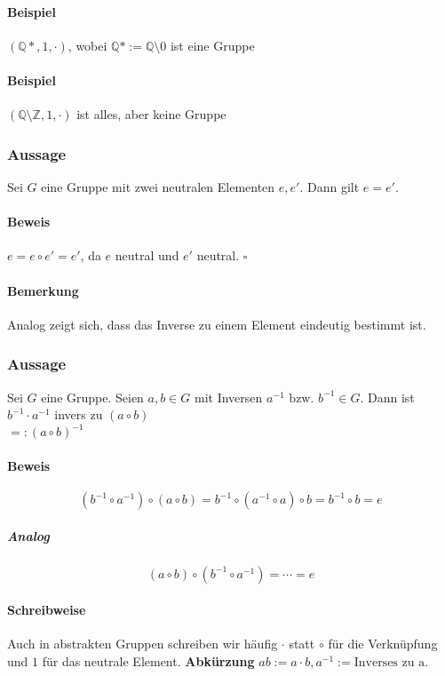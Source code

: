 \documentclass[14pt,a4paper]{article}
\newcommand{\Z}{\ensuremath{\mathbb{Z}}}
\newcommand{\Q}{\ensuremath{\mathbb{Q}}}
\begin{document}
    \paragraph{Beispiel} $(\mathbb{Q*}, 1, \cdot)$, wobei $\mathbb{Q}*:=\mathbb{Q}
    \setminus {0}$ ist eine Gruppe
    \paragraph{Beispiel} $(\Q \setminus \Z, 1, \cdot)$ ist alles, aber keine
    Gruppe

    \subsubsection{Aussage}
    Sei $G$ eine Gruppe mit zwei neutralen Elementen $e, e'$. Dann gilt $e = e'$.

    \paragraph{Beweis}
    $e = e \circ e' = e'$, da $e$ neutral und $e'$ neutral. $\square$

    \paragraph{Bemerkung}
    Analog zeigt sich, dass das Inverse zu einem Element eindeutig bestimmt ist.

    \subsubsection{Aussage}
    Sei $G$ eine Gruppe. Seien $a,b \in G$ mit Inversen $a^{-1} \text{ bzw. }
    b^{-1} \in G$.
    Dann ist $b^{-1} \cdot a^{-1}$ invers zu $(a \circ b)$ \\ $=: ( a \circ
    b)^{-1}$

    \paragraph{Beweis}
    $$ (b^{-1} \circ a^{-1}) \circ (a \circ b) = b^{-1} \circ (a^{-1} \circ a)
   \circ b = b^{-1} \circ b = e $$
    \subparagraph{Analog}
    $$ (a \circ b) \circ (b^{-1} \circ a^{-1}) = \dotsb = e $$

    \paragraph{Schreibweise}
    Auch in abstrakten Gruppen schreiben wir häufig $\cdot$ statt $\circ$ für die
    Verknüpfung und $1$ für das neutrale Element.
    \textbf{Abkürzung} $ab := a \cdot b, a^{-1} := \text{Inverses zu a}$.
\end{document}
